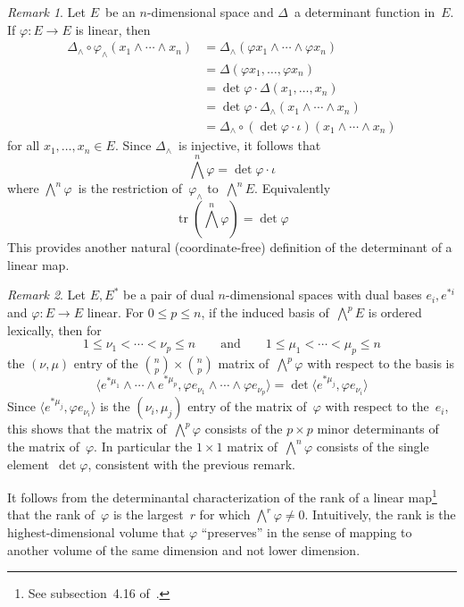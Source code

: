 \documentclass[letterpaper,12pt]{article}
\DeclareMathOperator{\tr}{tr}
\newcommand{\after}{\circ}
\newcommand{\mult}{\cdot}
\newcommand{\eprod}{\wedge}
\newcommand{\bigeprod}{\bigwedge}
\newcommand{\medeprod}{{\textstyle\bigeprod}}
\newcommand{\sprod}[2]{\langle#1,#2\rangle}
\newcommand{\multi}[4]{#2_{#3}#1\cdots#1#2_{#4}}
\newcommand{\eprods}[3]{\multi{\eprod}{#1}{#2}{#3}}
\theoremstyle{definition}
\theoremstyle{remark}
\newtheorem*{rmk}{Remark}
\begin{document}
\begin{rmk}
Let \(E\)~be an \(n\)-dimensional space and \(\Delta\)~a determinant function in~\(E\). If \(\varphi:E\to E\) is linear, then
\begin{align*}
\Delta_{\eprod}\after\varphi_{\eprod}(\eprods{x}{1}{n})&=\Delta_{\eprod}(\eprods{\varphi x}{1}{n})\\
	&=\Delta(\varphi x_1,\ldots,\varphi x_n)\\
	&=\det\varphi\mult\Delta(x_1,\ldots,x_n)\\
	&=\det\varphi\mult\Delta_{\eprod}(\eprods{x}{1}{n})\\
	&=\Delta_{\eprod}\after(\det\varphi\mult\iota)(\eprods{x}{1}{n})
\end{align*}
for all \(x_1,\ldots,x_n\in E\). Since \(\Delta_{\eprod}\)~is injective, it follows that
\[\medeprod^n\varphi=\det\varphi\mult\iota\]
where \(\medeprod^n\varphi\)~is the restriction of~\(\varphi_{\eprod}\) to~\(\medeprod^n E\). Equivalently
\[\tr(\medeprod^n\varphi)=\det\varphi\]
This provides another natural (coordinate-free) definition of the determinant of a linear map.
\end{rmk}

\begin{rmk}
Let \(E,E^*\) be a pair of dual \(n\)-dimensional spaces with dual bases \(e_i,e^{*i}\) and \(\varphi:E\to E\) linear. For \(0\le p\le n\), if the induced basis of~\(\medeprod^p E\) is ordered lexically, then for
\[1\le\nu_1<\cdots<\nu_p\le n\qquad\text{and}\qquad 1\le\mu_1<\cdots<\mu_p\le n\]
the \((\nu,\mu)\) entry of the \(\binom{n}{p}\times\binom{n}{p}\) matrix of~\(\medeprod^p\varphi\) with respect to the basis is
\[\sprod{e^{*\mu_1}\eprod\cdots\eprod e^{*\mu_p}}{\eprods{\varphi e}{\nu_1}{\nu_p}}=\det\sprod{e^{*\mu_j}}{\varphi e_{\nu_i}}\]
Since \(\sprod{e^{*\mu_j}}{\varphi e_{\nu_i}}\) is the \((\nu_i,\mu_j)\) entry of the matrix of~\(\varphi\) with respect to the~\(e_i\), this shows that the matrix of~\(\medeprod^p\varphi\) consists of the \(p\times p\) minor determinants of the matrix of~\(\varphi\). In particular the \(1\times 1\) matrix of~\(\medeprod^n\varphi\) consists of the single element~\(\det\varphi\), consistent with the previous remark.

It follows from the determinantal characterization of the rank of a linear map\footnote{See subsection~4.16 of~\cite{greub1}.} that the rank of~\(\varphi\) is the largest~\(r\) for which \(\medeprod^r\varphi\ne 0\). Intuitively, the rank is the highest-dimensional volume that \(\varphi\) ``preserves'' in the sense of mapping to another volume of the same dimension and not lower dimension.
\end{rmk}
\end{document}
